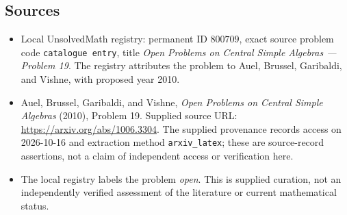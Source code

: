 \documentclass[11pt]{article}
\begin{document}
\subsection{Sources}
\begin{itemize}
\item Local UnsolvedMath registry: permanent ID \(800709\), exact source problem code \texttt{catalogue entry}, title \emph{Open Problems on Central Simple Algebras --- Problem 19}. The registry attributes the problem to Auel, Brussel, Garibaldi, and Vishne, with proposed year 2010.
\item Auel, Brussel, Garibaldi, and Vishne, \emph{Open Problems on Central Simple Algebras} (2010), Problem 19. Supplied source URL: \url{https://arxiv.org/abs/1006.3304}. The supplied provenance records access on 2026-10-16 and extraction method \texttt{arxiv\_latex}; these are source-record assertions, not a claim of independent access or verification here.
\item The local registry labels the problem \emph{open}. This is supplied curation, not an independently verified assessment of the literature or current mathematical status.
\end{itemize}
\end{document}
